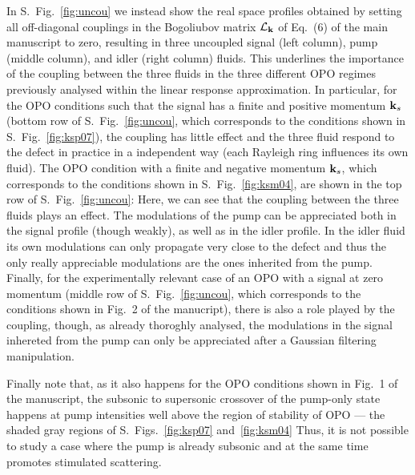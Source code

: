 In S.~Fig.~\ref{fig:uncou} we instead show the real space profiles
obtained by setting all off-diagonal couplings in the Bogoliubov
matrix $\mathcal{L}_{\mathbf{k}}$ of Eq.~(6) of the main manuscript to
zero, resulting in three uncoupled signal (left column), pump (middle
column), and idler (right column) fluids. This underlines the
importance of the coupling between the three fluids in the three
different OPO regimes previously analysed within the linear response
approximation. In particular, for the OPO conditions such that the
signal has a finite and positive momentum $\mathbf{k}_s$ (bottom row of
S.~Fig.~\ref{fig:uncou}, which corresponds to the conditions shown in
S.~Fig.~\ref{fig:ksp07}), the coupling has little effect and the three
fluid respond to the defect in practice in a independent way (each
Rayleigh ring influences its own fluid). The OPO condition with a
finite and negative momentum $\mathbf{k}_s$, which corresponds to the
conditions shown in S.~Fig.~\ref{fig:ksm04}, are shown in the top row
of S.~Fig.~\ref{fig:uncou}: Here, we can see that the coupling between
the three fluids plays an effect. The modulations of the pump can be
appreciated both in the signal profile (though weakly), as well as in
the idler profile. In the idler fluid its own modulations can only
propagate very close to the defect and thus the only really
appreciable modulations are the ones inherited from the pump. Finally,
for the experimentally relevant case of an OPO with a signal at zero
momentum (middle row of S.~Fig.~\ref{fig:uncou}, which corresponds to
the conditions shown in Fig.~2 of the manucript), there is also a role
played by the coupling, though, as already thoroghly analysed, the
modulations in the signal inhereted from the pump can only be
appreciated after a Gaussian filtering manipulation.


Finally note that, as it also happens for the OPO conditions shown in
Fig.~1 of the manuscript, the subsonic to supersonic crossover of the
pump-only state~\cite{Amo_2009} happens at pump intensities well above
the region of stability of OPO --- the shaded gray regions of
S.~Figs.~\ref{fig:ksp07} and~\ref{fig:ksm04} Thus, it is not possible
to study a case where the pump is already subsonic and at the same
time promotes stimulated scattering.



